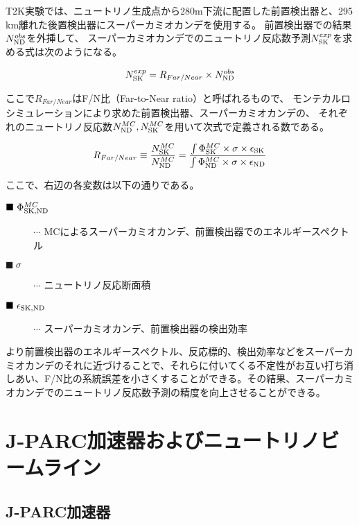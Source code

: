T2K実験では、ニュートリノ生成点から280m下流に配置した前置検出器と、295 km離れた後置検出器にスーパーカミオカンデを使用する。
前置検出器での結果$N_{\mathrm{ND}}^{obs}$を外挿して、
スーパーカミオカンデでのニュートリノ反応数予測$N_{\mathrm{SK}}^{exp}$を求める式は次のようになる。

\begin{equation}
N_{\mathrm{SK}}^{exp}  =  R_{Far/Near} \times N_{\mathrm{ND}}^{obs}
\label{Extrapolation}
\end{equation}

ここで$R_{Far/Near}$はF/N比（Far-to-Near ratio）と呼ばれるもので、
モンテカルロシミュレーションにより求めた前置検出器、スーパーカミオカンデの、
それぞれのニュートリノ反応数$N_{\mathrm{ND}}^{MC}, N_{\mathrm{SK}}^{MC}$を用いて次式で定義される数である。

\begin{equation}
R_{Far/Near} \equiv \frac{N_{\mathrm{SK}}^{MC}}{N_{\mathrm{ND}}^{MC}} = \frac{\int \Phi_{\mathrm{SK}}^{MC} \times \sigma \times \epsilon_{\mathrm{SK}}}{\int \Phi_{\mathrm{ND}}^{MC} \times \sigma \times \epsilon_{\mathrm{ND}}}
\label{FN}
\end{equation}

ここで、右辺の各変数は以下の通りである。
\begin{description}
\item [$\blacksquare\ \Phi_{\mathrm{SK}, \mathrm{ND}}^{MC}$] $\cdots$ MCによるスーパーカミオカンデ、前置検出器でのエネルギースペクトル
\item [$\blacksquare\ \sigma$] $\cdots$ ニュートリノ反応断面積
\item [$\blacksquare\ \epsilon_{\mathrm{SK}, \mathrm{ND}}$] $\cdots$ スーパーカミオカンデ、前置検出器の検出効率
\end{description}

より前置検出器のエネルギースペクトル、反応標的、検出効率などをスーパーカミオカンデのそれに近づけることで、それらに付いてくる不定性がお互い打ち消しあい、F/N比の系統誤差を小さくすることができる。その結果、スーパーカミオカンデでのニュートリノ反応数予測の精度を向上させることができる。



\section{J-PARC加速器およびニュートリノビームライン}

\subsection{J-PARC加速器}

